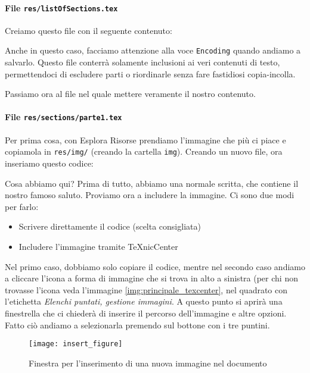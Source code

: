 \paragraph*{File \texttt{res/listOfSections.tex}} Creiamo questo file con il
seguente contenuto:



\noindent Anche in questo caso, facciamo attenzione alla voce \texttt{Encoding}
quando andiamo a salvarlo. Questo file conterrà solamente inclusioni ai veri
contenuti di testo, permettendoci di escludere parti o riordinarle senza fare
fastidiosi copia-incolla.

Passiamo ora al file nel quale mettere veramente il nostro contenuto.

\paragraph*{File \texttt{res/sections/parte1.tex}} Per prima cosa, con Esplora
Risorse prendiamo l'immagine che più ci piace e copiamola in \texttt{res/img/}
(creando la cartella \texttt{img}). Creando un nuovo file, ora inseriamo questo
codice:



\noindent Cosa abbiamo qui? Prima di tutto, abbiamo una normale scritta, che
contiene il nostro famoso saluto. Proviamo ora a includere la immagine.
Ci sono due modi per farlo:
\begin{itemize}
 \item Scrivere direttamente il codice (scelta consigliata)
 \item Includere l'immagine tramite TeXnicCenter
\end{itemize}

Nel primo caso, dobbiamo solo copiare il codice, mentre nel secondo caso
andiamo a cliccare l'icona a forma di immagine che si trova in alto a sinistra
(per chi non trovasse l'icona veda l'immagine \ref{img:principale_texcenter},
nel quadrato con l'etichetta \textit{Elenchi puntati, gestione immagini}.
A questo punto si aprirà una finestrella che ci chiederà di inserire il
percorso dell'immagine e altre opzioni. Fatto ciò andiamo a selezionarla
premendo sul bottone con i tre puntini.

\begin{figure}[H]
 \centering
 \texttt{[image: insert\_figure]}
 \caption{Finestra per l'inserimento di una nuova immagine nel documento}
 \label{img:insert_figure}
\end{figure}

